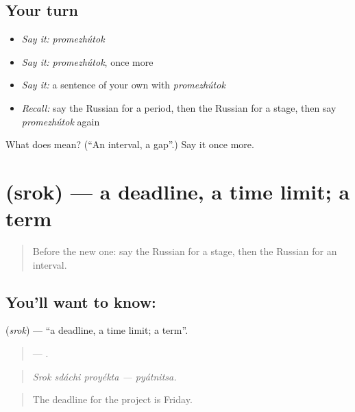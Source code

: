 \subsection*{Your turn}
\begin{itemize}
\raggedright
  \item \emph{Say it:} \emph{promezhútok}
  \item \emph{Say it:} \emph{promezhútok}, once more
  \item \emph{Say it:} a sentence of your own with \emph{promezhútok}
  \item \emph{Recall:} say the Russian for a period, then the Russian for a stage, then say \emph{promezhútok} again
\end{itemize}

\begin{tcolorbox}[breakable,colback=teal!4,colframe=teal!35!black,title={Before you move on}]
What does  mean? (\textquotedblleft{}An interval, a gap\textquotedblright{}.) Say it once more.
\end{tcolorbox}
\section[\texorpdfstring{\ru{срок} (srok)}{срок (srok)}]{ (srok) — a deadline, a time limit; a term}

\label{lesson:RU-C276-srok}



\begin{quote}
Before the new one: say the Russian for a stage, then the Russian for an interval.
\end{quote}

\subsection*{You'll want to know: }
\textbf{} (\emph{srok}) — \textquotedblleft{}a deadline, a time limit; a term\textquotedblright{}.

\begin{quote}
   — .
\end{quote}

\begin{quote}
\emph{Srok sdáchi proyékta — pyátnitsa.}
\end{quote}

\begin{quote}
The deadline for the project is Friday.
\end{quote}

